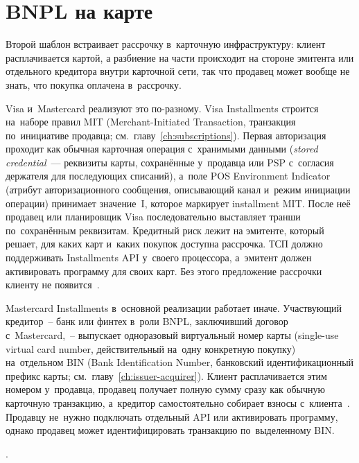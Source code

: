 \section{BNPL на карте}\label{sec:bnpl-on-card}

Второй шаблон встраивает рассрочку в~карточную инфраструктуру:
клиент расплачивается картой, а разбиение на части происходит
на стороне эмитента или отдельного кредитора внутри карточной
сети, так что продавец может вообще не знать, что покупка
оплачена в~рассрочку.

Visa и~Mastercard реализуют это по-разному. Visa Installments
строится на~наборе правил MIT (Merchant-Initiated Transaction,
транзакция по~инициативе продавца; см.~главу~\ref{ch:subscriptions}).
Первая авторизация проходит как обычная карточная операция с~хранимыми
данными (\textit{stored credential}~--- реквизиты карты, сохранённые
у~продавца или PSP с~согласия держателя для последующих списаний),
а~поле POS Environment Indicator (атрибут авторизационного сообщения,
описывающий канал и~режим инициации операции) принимает значение~I,
которое маркирует installment MIT. После неё продавец или планировщик
Visa последовательно выставляет транши по~сохранённым реквизитам.
Кредитный риск лежит на эмитенте, который решает, для каких карт
и~каких покупок доступна рассрочка. ТСП должно поддерживать
Installments API у~своего процессора, а~эмитент должен активировать
программу для своих карт. Без этого предложение рассрочки клиенту
не появится~\cite{visa-installments}.

Mastercard Installments в~основной реализации работает иначе.
Участвующий кредитор~-- банк или финтех в~роли BNPL, заключивший
договор с~Mastercard,~-- выпускает одноразовый виртуальный номер
карты (single-use virtual card number, действительный на~одну
конкретную покупку) на~отдельном BIN (Bank Identification Number,
банковский идентификационный префикс карты; см.~главу~\ref{ch:issuer-acquirer}).
Клиент расплачивается этим номером у~продавца, продавец получает
полную сумму сразу как обычную карточную транзакцию, а~кредитор
самостоятельно собирает взносы с~клиента~\cite{mc-installments}.
Продавцу не~нужно подключать отдельный API или активировать программу,
однако продавец может идентифицировать транзакцию по~выделенному BIN.

.


